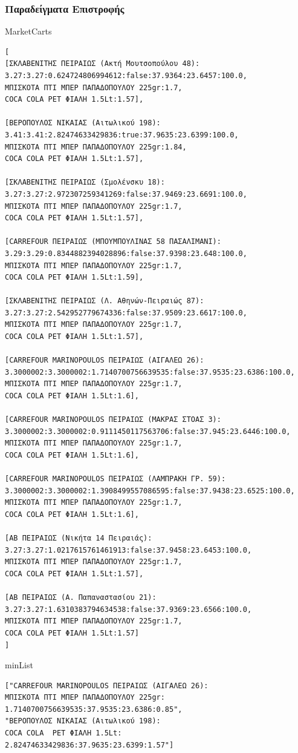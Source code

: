 \documentclass[a4paper,10pt]{report}
\begin{document}
\subsubsection{Παραδείγματα Επιστροφής}
MarketCarts \\
\begin{verbatim}
[
[ΣΚΛΑΒΕΝΙΤΗΣ ΠΕΙΡΑΙΩΣ (Ακτή Μουτσοπούλου 48):
3.27:3.27:0.624724806994612:false:37.9364:23.6457:100.0,
ΜΠΙΣΚΟΤΑ ΠΤΙ ΜΠΕΡ ΠΑΠΑΔΟΠΟΥΛΟΥ 225gr:1.7,
COCA COLA PET ΦΙΑΛΗ 1.5Lt:1.57],

[ΒΕΡΟΠΟΥΛΟΣ ΝΙΚΑΙΑΣ (Αιτωλικού 198):
3.41:3.41:2.82474633429836:true:37.9635:23.6399:100.0,
ΜΠΙΣΚΟΤΑ ΠΤΙ ΜΠΕΡ ΠΑΠΑΔΟΠΟΥΛΟΥ 225gr:1.84,
COCA COLA PET ΦΙΑΛΗ 1.5Lt:1.57],

[ΣΚΛΑΒΕΝΙΤΗΣ ΠΕΙΡΑΙΩΣ (Σμολένσκυ 18):
3.27:3.27:2.972307259341269:false:37.9469:23.6691:100.0,
ΜΠΙΣΚΟΤΑ ΠΤΙ ΜΠΕΡ ΠΑΠΑΔΟΠΟΥΛΟΥ 225gr:1.7,
COCA COLA PET ΦΙΑΛΗ 1.5Lt:1.57],

[CARREFOUR ΠΕΙΡΑΙΩΣ (ΜΠΟΥΜΠΟΥΛΙΝΑΣ 58 ΠΑΣΑΛΙΜΑΝΙ):
3.29:3.29:0.8344882394028896:false:37.9398:23.648:100.0,
ΜΠΙΣΚΟΤΑ ΠΤΙ ΜΠΕΡ ΠΑΠΑΔΟΠΟΥΛΟΥ 225gr:1.7,
COCA COLA PET ΦΙΑΛΗ 1.5Lt:1.59],

[ΣΚΛΑΒΕΝΙΤΗΣ ΠΕΙΡΑΙΩΣ (Λ. Αθηνών-Πειραιώς 87):
3.27:3.27:2.542952779674336:false:37.9509:23.6617:100.0,
ΜΠΙΣΚΟΤΑ ΠΤΙ ΜΠΕΡ ΠΑΠΑΔΟΠΟΥΛΟΥ 225gr:1.7,
COCA COLA PET ΦΙΑΛΗ 1.5Lt:1.57],

[CARREFOUR MARINOPOULOS ΠΕΙΡΑΙΩΣ (ΑΙΓΑΛΕΩ 26):
3.3000002:3.3000002:1.7140700756639535:false:37.9535:23.6386:100.0,
ΜΠΙΣΚΟΤΑ ΠΤΙ ΜΠΕΡ ΠΑΠΑΔΟΠΟΥΛΟΥ 225gr:1.7,
COCA COLA PET ΦΙΑΛΗ 1.5Lt:1.6],

[CARREFOUR MARINOPOULOS ΠΕΙΡΑΙΩΣ (ΜΑΚΡΑΣ ΣΤΟΑΣ 3):
3.3000002:3.3000002:0.9111450117563706:false:37.945:23.6446:100.0,
ΜΠΙΣΚΟΤΑ ΠΤΙ ΜΠΕΡ ΠΑΠΑΔΟΠΟΥΛΟΥ 225gr:1.7,
COCA COLA PET ΦΙΑΛΗ 1.5Lt:1.6],

[CARREFOUR MARINOPOULOS ΠΕΙΡΑΙΩΣ (ΛΑΜΠΡΑΚΗ ΓΡ. 59):
3.3000002:3.3000002:1.3908499557086595:false:37.9438:23.6525:100.0,
ΜΠΙΣΚΟΤΑ ΠΤΙ ΜΠΕΡ ΠΑΠΑΔΟΠΟΥΛΟΥ 225gr:1.7,
COCA COLA PET ΦΙΑΛΗ 1.5Lt:1.6],

[ΑΒ ΠΕΙΡΑΙΩΣ (Νικήτα 14 Πειραιάς):
3.27:3.27:1.0217615761461913:false:37.9458:23.6453:100.0,
ΜΠΙΣΚΟΤΑ ΠΤΙ ΜΠΕΡ ΠΑΠΑΔΟΠΟΥΛΟΥ 225gr:1.7,
COCA COLA PET ΦΙΑΛΗ 1.5Lt:1.57],

[ΑΒ ΠΕΙΡΑΙΩΣ (Α. Παπαναστασίου 21):
3.27:3.27:1.6310383794634538:false:37.9369:23.6566:100.0,
ΜΠΙΣΚΟΤΑ ΠΤΙ ΜΠΕΡ ΠΑΠΑΔΟΠΟΥΛΟΥ 225gr:1.7,
COCA COLA PET ΦΙΑΛΗ 1.5Lt:1.57]
]
\end{verbatim}

minList\\
\begin{verbatim}
["CARREFOUR MARINOPOULOS ΠΕΙΡΑΙΩΣ (ΑΙΓΑΛΕΩ 26):
ΜΠΙΣΚΟΤΑ ΠΤΙ ΜΠΕΡ ΠΑΠΑΔΟΠΟΥΛΟΥ 225gr:
1.7140700756639535:37.9535:23.6386:0.85",
"ΒΕΡΟΠΟΥΛΟΣ ΝΙΚΑΙΑΣ (Αιτωλικού 198):
COCA COLA  PET ΦΙΑΛΗ 1.5Lt:
2.82474633429836:37.9635:23.6399:1.57"]
\end{verbatim}
\end{document}

